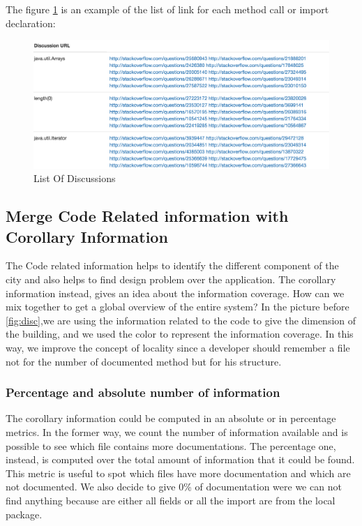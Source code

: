 \documentclass[]{usiinfbachelorproject}
\begin{document}
\footnotemark

The figure \ref{fig:list} is an example of  the list of link for each method call or import declaration:


 \begin{figure}[H]
	\centering
	\includegraphics[width=1\textwidth]{images/listOfDiscussions}
		\caption[List Of Discussions]{List Of Discussions \label{fig:list}
}

\end{figure}


\subsection{Merge Code Related information with Corollary Information}
The Code related information helps to identify the different component of the city and also helps to find design problem over the application. The corollary information instead, gives an idea about the information coverage. How can we mix together to get a global overview of the entire system? In the picture before  \ref{fig:disc},we are using the information related to the code to give the dimension of the building, and we used the color to represent the information coverage. In this way, we improve the concept of locality since a developer should remember a file not for the number of documented method but for his structure.

\subsubsection{Percentage and absolute number of information}
The corollary information could be computed in an absolute or in percentage metrics. In the former way, we count the number of information available and is possible to see which file contains more documentations. The percentage one, instead, is computed over the total amount of information that it could be found. This metric is useful to spot which files have more documentation and which are not documented. We also decide to give 0\% of documentation were we can not find anything because are either all fields or all the import are from the local package.
\end{document}
